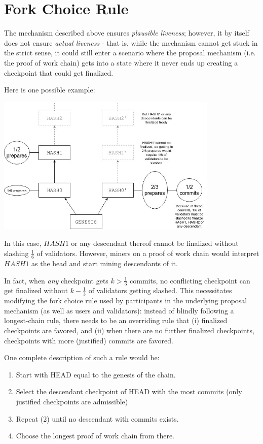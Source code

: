 \documentclass[12pt]{article}
\begin{document}
\section{Fork Choice Rule}

The mechanism described above ensures \textit{plausible liveness}; however, it by itself does not ensure \textit{actual liveness} - that is, while the mechanism cannot get stuck in the strict sense, it could still enter a scenario where the proposal mechanism (i.e. the proof of work chain) gets into a state where it never ends up creating a checkpoint that could get finalized.

Here is one possible example:

\includegraphics[width=400px]{fork_choice_rule.jpeg}

In this case, $HASH1$ or any descendant thereof cannot be finalized without slashing $\frac{1}{6}$ of validators. However, miners on a proof of work chain would interpret $HASH1$ as the head and start mining descendants of it.

In fact, when \textit{any} checkpoint gets $k > \frac{1}{3}$ commits, no conflicting checkpoint can get finalized without $k - \frac{1}{3}$ of validators getting slashed. This necessitates modifying the fork choice rule used by participants in the underlying proposal mechanism (as well as users and validators): instead of blindly following a longest-chain rule, there needs to be an overriding rule that (i) finalized checkpoints are favored, and (ii) when there are no further finalized checkpoints, checkpoints with more (justified) commits are favored.

One complete description of such a rule would be:

\begin{enumerate}
\item Start with HEAD equal to the genesis of the chain.
\item Select the descendant checkpoint of HEAD with the most commits (only justified checkpoints are admissible)
\item Repeat (2) until no descendant with commits exists.
\item Choose the longest proof of work chain from there.
\end{enumerate}
\end{document}
